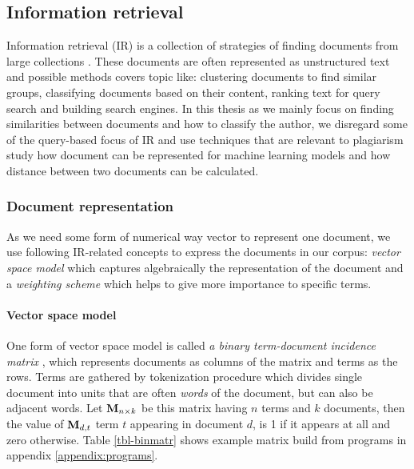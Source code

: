 \subsection{Information retrieval}

Information retrieval (IR) is a collection of strategies of finding documents from large collections \cite{Manning:2008:IIR:1394399}. These documents are often represented as unstructured text and possible methods covers topic like: clustering documents to find similar groups, classifying documents based on their content, ranking text for query search and building search engines. In this thesis as we mainly focus on finding similarities between documents and how to classify the author, we disregard some of the query-based focus of IR and use techniques that are relevant to plagiarism study \ie how document can be represented for machine learning models and how distance between two documents can be calculated.




\subsubsection{Document representation}

As we need some form of numerical way \ie vector to represent one document, we use following IR-related concepts to express the documents in our corpus: \emph{vector space model} which captures algebraically the representation of the document and a \emph{weighting scheme} which helps to give more importance to specific terms.


\paragraph{Vector space model}

One form of vector space model is called \emph{a binary term-document incidence matrix} \cite{Manning:2008:IIR:1394399}, which represents documents as columns of the matrix and terms as the rows. Terms are gathered by tokenization procedure which divides single document into units that are often \emph{words} of the document, but can also be \eg adjacent words. Let $\mathbf{M}_{n \times k}$ be this matrix having $n$ terms and $k$ documents, then the value of $\mathbf{M}_{d, t}$ \ie term $t$ appearing in document $d$, is 1 if it appears at all and zero otherwise. Table \ref{tbl-binmatr} shows example matrix build from programs in appendix \ref{appendix:programs}.  


